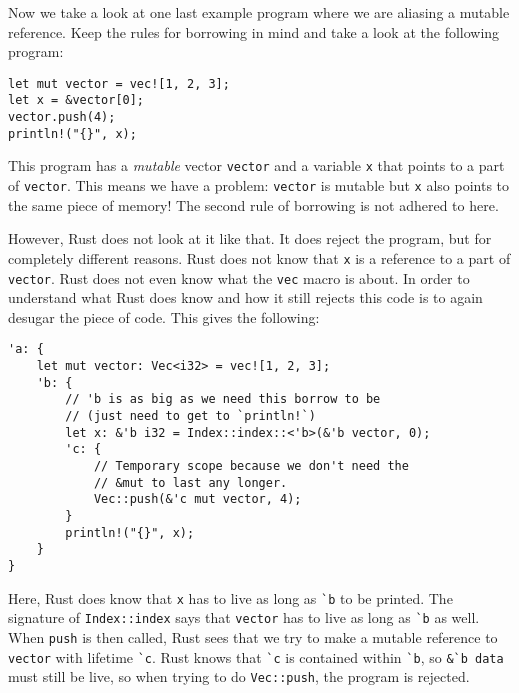Now we take a look at one last example program where we are aliasing a mutable reference. Keep the rules for borrowing in mind and take a look at the following program:

\begin{verbatim}
let mut vector = vec![1, 2, 3];
let x = &vector[0];
vector.push(4);
println!("{}", x);
\end{verbatim}

This program has a \textit{mutable} vector \verb|vector| and a variable \verb|x| that points to a part of \verb|vector|. This means we have a problem:  \verb|vector| is mutable but \verb|x| also points to the same piece of memory! The second rule of borrowing is not adhered to here. 

However, Rust does not look at it like that. It does reject the program, but for completely different reasons. Rust does not know that \verb|x| is a reference to a part of \verb|vector|. Rust does not even know what the \verb|vec| macro is about. In order to understand what Rust does know and how it still rejects this code is to again desugar the piece of code. This gives the following: 

\begin{verbatim}
'a: {
    let mut vector: Vec<i32> = vec![1, 2, 3];
    'b: {
        // 'b is as big as we need this borrow to be
        // (just need to get to `println!`)
        let x: &'b i32 = Index::index::<'b>(&'b vector, 0);
        'c: {
            // Temporary scope because we don't need the
            // &mut to last any longer.
            Vec::push(&'c mut vector, 4);
        }
        println!("{}", x);
    }
}
\end{verbatim}

Here, Rust does know that \verb|x| has to live as long as \verb|`b| to be printed. The signature of \verb|Index::index| says that \verb|vector| has to live as long as \verb|`b| as well. When \verb|push| is then called, Rust sees that we try to make a mutable reference to \verb|vector| with lifetime \verb|`c|. Rust knows that \verb|`c| is contained within \verb|`b|, so \verb|&`b data| must still be live, so when trying to do \verb|Vec::push|, the program is rejected. 